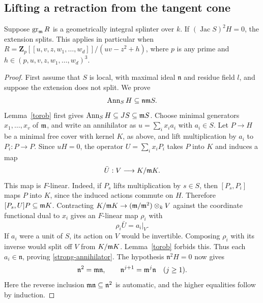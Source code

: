 \subsection{Lifting a retraction from the tangent cone}\label{tangent}
\begin{theorem}\label{tangent-theorem}
Suppose $\operatorname{gr}_{\mathfrak m}R$ is a geometrically integral splinter over $k$. If
$(\operatorname{Jac} S)^2 H=0$, the extension splits.
This applies in particular when
$R=\mathbf Z_p[[u,v,z,w_1,\ldots,w_d]]/(uv-z^2+h)$,
where $p$ is any prime and $h\in(p,u,v,z,w_1,\ldots,w_d)^3$.
\end{theorem}
\begin{proof}
First assume that $S$ is local, with maximal ideal $\mathfrak n$
and residue field $l$, and suppose the extension does not split.
We prove
\begin{equation}\label{strong-annihilator}
 \operatorname{Ann}_S H\subseteq\mathfrak n\mathfrak m S.
\end{equation}
Lemma~\ref{torob} first gives
$\operatorname{Ann}_S H\subseteq JS\subseteq\mathfrak m S$.
Choose minimal generators $x_1,\ldots,x_v$ of $\mathfrak m$, and write an
annihilator as $u=\sum_i x_i a_i$ with $a_i\in S$.
Let $P\to H$ be a minimal free cover with kernel $K$, as above,
and lift multiplication by $a_i$ to $P_i:P\to P$.
Since $uH=0$, the operator $U=\sum_i x_iP_i$ takes $P$ into $K$
and induces a map
\[
 \bar U:V\longrightarrow K/\mathfrak m K.
\]
This map is $F$-linear.  Indeed, if $P_s$ lifts multiplication by
$s\in S$, then $[P_s,P_i]$ maps $P$ into $K$, since the induced
actions commute on $H$.  Therefore
$[P_s,U]P\subseteq\mathfrak m K$.
Contracting $K/\mathfrak m K\to(\mathfrak m/\mathfrak m^2)\otimes_kV$ against the coordinate
functional dual to $x_i$ gives an $F$-linear map $\rho_i$ with
\[
 \rho_i\bar U=a_i|_V.
\]
If $a_i$ were a unit of $S$, its action on $V$ would be invertible. Composing $\rho_i$ with its inverse would split off $V$ from
$K/\mathfrak m K$.  Lemma~\ref{torob} forbids this.  Thus each
$a_i\in\mathfrak n$, proving \eqref{strong-annihilator}.
The hypothesis $\mathfrak n^2H=0$ now gives
\begin{equation}\label{minimal-target-filtration}
 \mathfrak n^2=\mathfrak m\mathfrak n,
 \qquad \mathfrak n^{j+1}=\mathfrak m^j\mathfrak n\quad(j\geq1).
\end{equation}
Here the reverse inclusion $\mathfrak m\mathfrak n\subseteq\mathfrak n^2$
is automatic, and the higher equalities follow by induction.


\end{proof}
